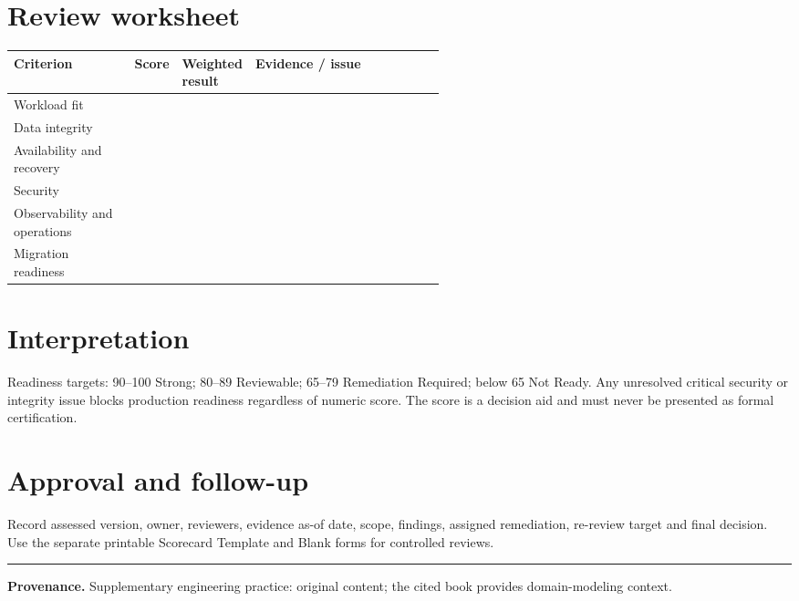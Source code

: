 \documentclass[11pt,letterpaper]{article}
\begin{document}
\section{Review worksheet}
\begin{tabularx}{\linewidth}{@{}>{\raggedright\arraybackslash}p{0.28\linewidth} >{\raggedright\arraybackslash}p{0.1\linewidth} >{\raggedright\arraybackslash}p{0.17\linewidth}>{\raggedright\arraybackslash}X@{}}
\toprule
\textbf{Criterion} & \textbf{Score} & \textbf{Weighted result} & \textbf{Evidence / issue} \\ 
\midrule
Workload fit &  &  &  \\ 
Data integrity &  &  &  \\ 
Availability and recovery &  &  &  \\ 
Security &  &  &  \\ 
Observability and operations &  &  &  \\ 
Migration readiness &  &  &  \\ 
\bottomrule
\end{tabularx}

\section{Interpretation}
Readiness targets: 90--100 Strong; 80--89 Reviewable; 65--79 Remediation Required; below 65 Not Ready. Any unresolved critical security or integrity issue blocks production readiness regardless of numeric score. The score is a decision aid and must never be presented as formal certification.


\section{Approval and follow-up}
Record assessed version, owner, reviewers, evidence as-of date, scope, findings, assigned remediation, re-review target and final decision. Use the separate printable Scorecard Template and Blank forms for controlled reviews.


\vfill
\hrule
{\footnotesize\textbf{Provenance.} Supplementary engineering practice: original content; the cited book provides domain-modeling context.}
\end{document}
